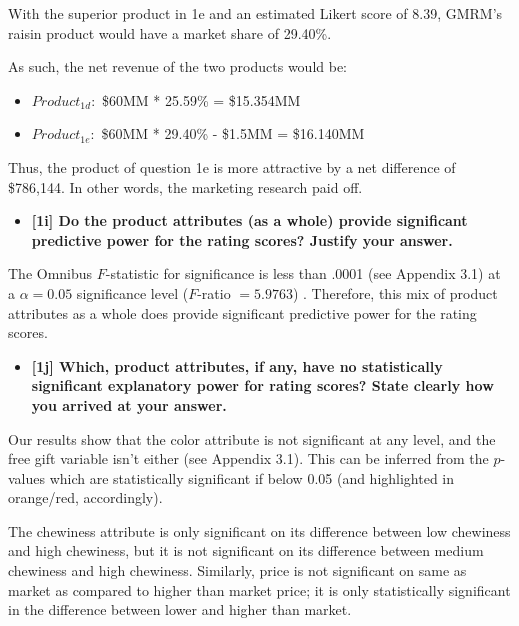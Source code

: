 \documentclass[10pt, oneside,spanish]{article}
\begin{document}
With the superior product in 1e and an estimated Likert score of 8.39, GMRM's raisin product would have a market share of 29.40\%.

As such, the net revenue of the two products would be:
\begin{itemize}
\item $Product_{1d}: $ \$60MM * 25.59\% = \$15.354MM
\item $Product_{1e}: $ \$60MM * 29.40\% - \$1.5MM = \$16.140MM

\end{itemize}

	
    
    
Thus, the product of question 1e is more attractive by a net difference of \$786,144. In other words, the marketing research paid off.


\begin{itemize}
\item \textbf{[1i] Do the product attributes (as a whole) provide significant predictive power for the rating scores?  Justify your answer.    }
\end{itemize}


The Omnibus $F$-statistic for significance is less than .0001 (see Appendix 3.1) at a $\alpha = 0.05$ significance level ($F$-ratio $ = 5.9763 $) . Therefore, this mix of product attributes as a whole does provide significant predictive power for the rating scores. 

\begin{itemize}
\item \textbf{[1j]   Which, product attributes, if any, have no statistically significant explanatory power for rating scores?  State clearly how you arrived at your answer.  }
\end{itemize}



Our results show that the color attribute is not significant at any level, and the free gift variable isn't either (see Appendix 3.1). This can be inferred from the $p$-values which are statistically significant if below 0.05 (and highlighted in orange/red, accordingly). 

The chewiness attribute is only significant on its difference between low chewiness and high chewiness, but it is not significant on its difference between medium chewiness and high chewiness.  Similarly, price is not significant on same as market as compared to higher than market price; it is only statistically significant in the difference between lower and higher than market. 
\end{document}
